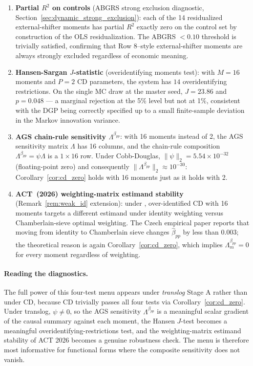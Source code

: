\documentclass[11pt]{article}
\begin{document}
\begin{enumerate}
\item \textbf{Partial $R^2$ on controls} (ABGRS strong exclusion diagnostic, Section~\ref{sec:dynamic_strong_exclusion}): each of the 14 residualized external-shifter moments has partial $R^2$ exactly zero on the control set by construction of the OLS residualization. The ABGRS $< 0.10$ threshold is trivially satisfied, confirming that Row 8--style external-shifter moments are always strongly excluded regardless of economic meaning.
\item \textbf{Hansen-Sargan $J$-statistic} (overidentifying moments test): with $M = 16$ moments and $P = 2$ CD parameters, the system has $14$ overidentifying restrictions. On the single MC draw at the master seed, $J = 23.86$ and $p = 0.048$ --- a marginal rejection at the 5\% level but not at 1\%, consistent with the DGP being correctly specified up to a small finite-sample deviation in the Markov innovation variance.
\item \textbf{AGS chain-rule sensitivity $\Lambda^{\beta_{pp}}$}: with 16 moments instead of 2, the AGS sensitivity matrix $\Lambda$ has 16 columns, and the chain-rule composition $\Lambda^{\beta_{pp}} = \psi\Lambda$ is a $1\times 16$ row. Under Cobb-Douglas, $\|\psi\|_2 = 5.54 \times 10^{-32}$ (floating-point zero) and consequently $\|\Lambda^{\beta_{pp}}\|_2 \approx 10^{-30}$: Corollary~\ref{cor:cd_zero} holds with 16 moments just as it holds with 2.
\item \textbf{ACT~(2026) weighting-matrix estimand stability} (Remark~\ref{rem:weak_id} extension): under \citet{AndrewsChenTecchio2026}, over-identified CD with 16 moments targets a different estimand under identity weighting versus Chamberlain-sieve optimal weighting. The Czech empirical paper reports that moving from identity to Chamberlain sieve changes $\hat\beta_{pp}$ by less than $0.003$; the theoretical reason is again Corollary~\ref{cor:cd_zero}, which implies $\Lambda^{\beta_{pp}}_m = 0$ for every moment regardless of weighting.
\end{enumerate}

\paragraph{Reading the diagnostics.} The full power of this four-test menu appears under \emph{translog} Stage A rather than under CD, because CD trivially passes all four tests via Corollary~\ref{cor:cd_zero}. Under translog, $\psi \neq 0$, so the AGS sensitivity $\Lambda^{\beta_{pp}}$ is a meaningful scalar gradient of the causal summary against each moment, the Hansen $J$-test becomes a meaningful overidentifying-restrictions test, and the weighting-matrix estimand stability of ACT 2026 becomes a genuine robustness check. The menu is therefore most informative for functional forms where the composite sensitivity does not vanish.
\end{document}
